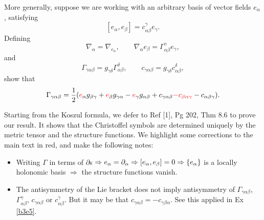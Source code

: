 \documentclass[10pt]{article}
\begin{document}
\begin{example}\label{b3e4}
	More generally, suppose we are working with an arbitrary basis of vector fields $e_\alpha$, satisfying
	$$
	[e_\alpha,e_\beta]=c_{\alpha\beta}^\gamma e_\gamma.
	$$
	Defining
	$$
	\nabla_\alpha=\nabla_{e_\alpha},\qquad\nabla_\alpha e_\beta=\Gamma_{\alpha\beta}^\gamma e_\gamma,
	$$
	and
	$$
	\Gamma_{\gamma\alpha\beta}=g_{\gamma\delta}\Gamma_{\alpha\beta}^\delta,\qquad c_{\gamma\alpha\beta}=g_{\gamma\delta}c_{\alpha\beta}^\delta,
	$$
	show that
	$$
	\Gamma_{\gamma\alpha\beta}=\frac12({\color{red}e}_\alpha g_{\beta\gamma}+{\color{red}e}_\beta g_{\gamma\alpha}-{\color{red}e}_\gamma g_{\alpha\beta}+c_{\gamma\alpha\beta}{\color{red}-c_{\beta\alpha\gamma}}-c_{\alpha\beta\gamma}).
	$$
\end{example}
\sol Starting from the Koszul formula, we defer to Ref [1], Pg 202, Thm 8.6 to prove our result. It shows that the Christoffel symbols are determined uniquely by the metric tensor and the structure functions. We highlight some corrections to the main text in {\color{red}red}, and make the following notes:
\begin{itemize}
	\item Writing $\Gamma$ in terms of $\partial$s $\Rightarrow e_\alpha = \partial_\alpha \Rightarrow [e_\alpha,e_\beta]=0 \Rightarrow \lbrace e_\alpha\rbrace$ is a locally holonomic basis $\Rightarrow$ the structure functions vanish.
	\item The antisymmetry of the Lie bracket does not imply antisymmetry of $\Gamma_{\gamma\alpha\beta}$, $\Gamma_{\alpha\beta}^\gamma$, $c_{\gamma\alpha\beta}$ or $c_{\alpha\beta}^\gamma$. But it may be that $c_{\gamma\alpha\beta} = -c_{\gamma\beta\alpha}$. See this applied in Ex \ref{b3e5}.
\end{itemize}
\end{document}
